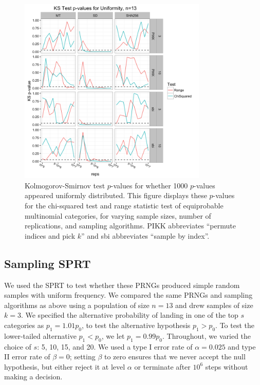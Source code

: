 \documentclass[12pt]{article}
\begin{document}
\begin{figure}[h]
\begin{center}
\includegraphics[width=0.8\textwidth]{fig/fixed-sample-size-ks-pvalues.png}
\caption{Kolmogorov-Smirnov test $p$-values for whether 1000 $p$-values appeared uniformly distributed. This figure displays these $p$-values for the chi-squared test and range statistic test of equiprobable multinomial categories, for varying sample sizes, number of replications, and sampling algorithms. PIKK abbreviates ``permute indices and pick $k$'' and sbi abbreviates ``sample by index''.}
\label{fig:fixed-sample-size}
\end{center}
\end{figure}


\subsection{Sampling SPRT}
We used the SPRT to test whether these PRNGs produced simple random samples with uniform frequency.
We compared the same PRNGs and sampling algorithms as above
using a population of size $n=13$ and drew samples of size $k=3$. 
We specified the alternative probability of landing in one of the top $s$ categories as $p_1 = 1.01p_0$, to test the alternative hypothesis $p_1 > p_0$.
To test the lower-tailed alternative $p_1 < p_0$, we let $p_1 = 0.99 p_0$. 
Throughout, we varied the choice of $s$: 5, 10, 15, and 20. 
We used a type I error rate of $\alpha=0.025$ and type II error rate of $\beta = 0$; 
setting $\beta$ to zero ensures that we never accept the null hypothesis, but either reject it at level $\alpha$ or terminate after $10^6$ steps without making a decision.
\end{document}
